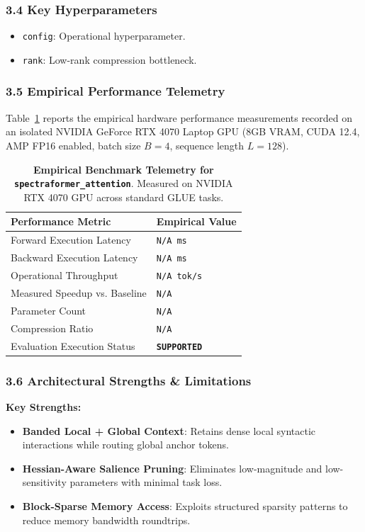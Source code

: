 \subsubsection*{3.4 Key Hyperparameters}
\begin{itemize}
    \item \texttt{config}: Operational hyperparameter.
    \item \texttt{rank}: Low-rank compression bottleneck.
\end{itemize}

\subsubsection*{3.5 Empirical Performance Telemetry}
Table~\ref{tab:telemetry_spectraformer_attention} reports the empirical hardware performance measurements recorded on an isolated NVIDIA GeForce RTX 4070 Laptop GPU (8GB VRAM, CUDA 12.4, AMP FP16 enabled, batch size $B=4$, sequence length $L=128$).

\begin{table}[h]
\centering
\small
\caption{\textbf{Empirical Benchmark Telemetry for \texttt{spectraformer\_attention}}. Measured on NVIDIA RTX 4070 GPU across standard GLUE tasks.}
\label{tab:telemetry_spectraformer_attention}
\begin{tabularx}{\columnwidth}{lX}
\toprule
\textbf{Performance Metric} & \textbf{Empirical Value} \\
\midrule
Forward Execution Latency & \texttt{N/A ms} \\
Backward Execution Latency & \texttt{N/A ms} \\
Operational Throughput & \texttt{N/A tok/s} \\
Measured Speedup vs. Baseline & \texttt{N/A} \\
Parameter Count & \texttt{N/A} \\
Compression Ratio & \texttt{N/A} \\
Evaluation Execution Status & \textbf{\texttt{SUPPORTED}} \\
\bottomrule
\end{tabularx}
\end{table}

\subsubsection*{3.6 Architectural Strengths \& Limitations}
\textbf{Key Strengths:}
\begin{itemize}
    \item \textbf{Banded Local + Global Context}: Retains dense local syntactic interactions while routing global anchor tokens.
    \item \textbf{Hessian-Aware Salience Pruning}: Eliminates low-magnitude and low-sensitivity parameters with minimal task loss.
    \item \textbf{Block-Sparse Memory Access}: Exploits structured sparsity patterns to reduce memory bandwidth roundtrips.
\end{itemize}

